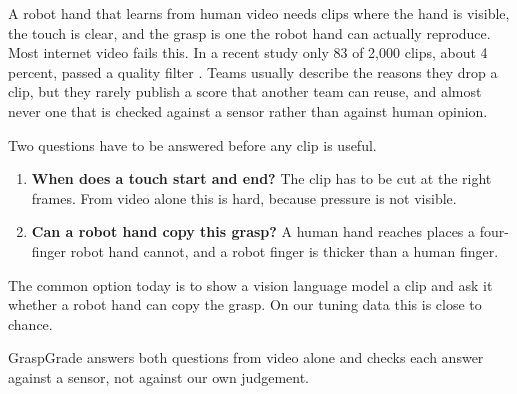 \documentclass[10pt,twocolumn,letterpaper]{article}
\begin{document}
A robot hand that learns from human video needs clips where the hand is
visible, the touch is clear, and the grasp is one the robot hand can actually
reproduce. Most internet video fails this. In a recent study only 83 of 2,000
clips, about 4 percent, passed a quality filter \cite{doasido}. Teams usually
describe the reasons they drop a clip, but they rarely publish a score that
another team can reuse, and almost never one that is checked against a sensor
rather than against human opinion.

Two questions have to be answered before any clip is useful.

\begin{enumerate}
\item \textbf{When does a touch start and end?} The clip has to be cut at the
right frames. From video alone this is hard, because pressure is not visible.
\item \textbf{Can a robot hand copy this grasp?} A human hand reaches places a
four-finger robot hand cannot, and a robot finger is thicker than a human
finger.
\end{enumerate}

The common option today is to show a vision language model a clip and ask it
whether a robot hand can copy the grasp. On our tuning data this is close to
chance.

GraspGrade answers both questions from video alone and checks each answer
against a sensor, not against our own judgement.
\end{document}
